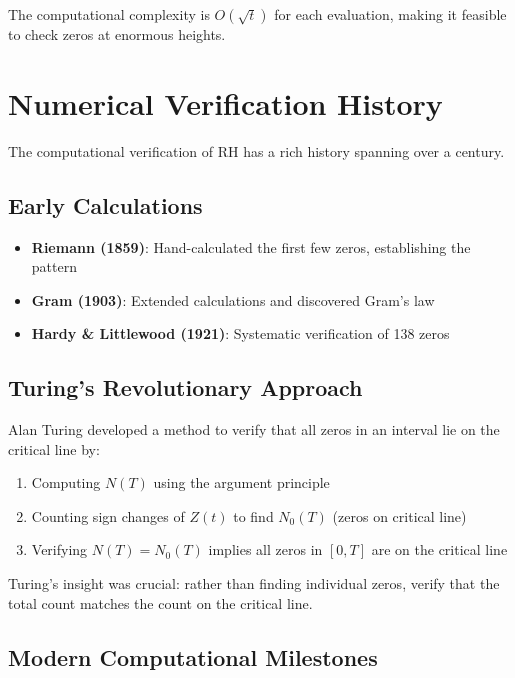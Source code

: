 The computational complexity is $O(\sqrt{t})$ for each evaluation, making it feasible to check zeros at enormous heights.

\section{Numerical Verification History}
\label{sec:verification-history}

The computational verification of RH has a rich history spanning over a century.

\subsection{Early Calculations}

\begin{itemize}
\item \textbf{Riemann (1859)}: Hand-calculated the first few zeros, establishing the pattern
\item \textbf{Gram (1903)}: Extended calculations and discovered Gram's law
\item \textbf{Hardy \& Littlewood (1921)}: Systematic verification of 138 zeros
\end{itemize}

\subsection{Turing's Revolutionary Approach}

\begin{theorem}
Alan Turing developed a method to verify that all zeros in an interval lie on the critical line by:
\begin{enumerate}
\item Computing $N(T)$ using the argument principle
\item Counting sign changes of $Z(t)$ to find $N_0(T)$ (zeros on critical line)
\item Verifying $N(T) = N_0(T)$ implies all zeros in $[0,T]$ are on the critical line
\end{enumerate}
\end{theorem}

Turing's insight was crucial: rather than finding individual zeros, verify that the total count matches the count on the critical line.

\subsection{Modern Computational Milestones}


